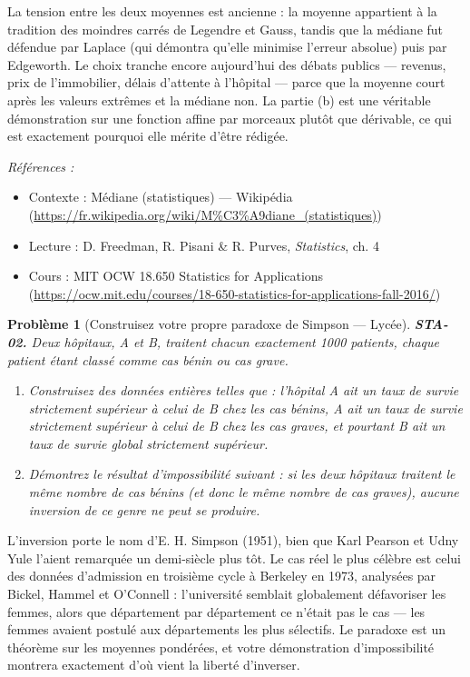 \documentclass[11pt]{article}
\newtheorem{problem}{Problème}
\newenvironment{refs}{\par\small\noindent\emph{Références :}\begin{itemize}\setlength\itemsep{0pt}}{\end{itemize}\normalsize}
\begin{document}
\noindent La tension entre les deux moyennes est ancienne : la moyenne appartient à la
tradition des moindres carrés de Legendre et Gauss, tandis que la médiane fut défendue par Laplace
(qui démontra qu'elle minimise l'erreur absolue) puis par Edgeworth. Le choix tranche encore
aujourd'hui des débats publics --- revenus, prix de l'immobilier, délais d'attente à l'hôpital ---
parce que la moyenne court après les valeurs extrêmes et la médiane non. La partie (b) est une
véritable démonstration sur une fonction affine par morceaux plutôt que dérivable, ce qui est
exactement pourquoi elle mérite d'être rédigée.

\begin{refs}
\item Contexte : Médiane (statistiques) --- Wikipédia (\url{https://fr.wikipedia.org/wiki/M%C3%A9diane_(statistiques)})
\item Lecture : D. Freedman, R. Pisani \& R. Purves, \textit{Statistics}, ch. 4
\item Cours : MIT OCW 18.650 Statistics for Applications (\url{https://ocw.mit.edu/courses/18-650-statistics-for-applications-fall-2016/})
\end{refs}

\bigskip

\begin{problem}[{Construisez votre propre paradoxe de Simpson --- Lycée}]
\textbf{STA-02.} Deux hôpitaux, A et B, traitent chacun exactement 1000 patients, chaque
patient étant classé comme cas bénin ou cas grave.
\begin{enumerate}
\item[(a)] Construisez des données entières telles que : l'hôpital A ait un taux de survie strictement
supérieur à celui de B chez les cas bénins, A ait un taux de survie strictement supérieur à celui
de B chez les cas graves, et pourtant B ait un taux de survie global strictement supérieur.
\item[(b)] Démontrez le résultat d'impossibilité suivant : si les deux hôpitaux traitent le \textit{même
nombre} de cas bénins (et donc le même nombre de cas graves), aucune inversion de ce genre ne
peut se produire.
\end{enumerate}

\end{problem}

\noindent L'inversion porte le nom d'E. H. Simpson (1951), bien que Karl Pearson et Udny
Yule l'aient remarquée un demi-siècle plus tôt. Le cas réel le plus célèbre est celui des données
d'admission en troisième cycle à Berkeley en 1973, analysées par Bickel, Hammel et O'Connell :
l'université semblait globalement défavoriser les femmes, alors que département par département ce
n'était pas le cas --- les femmes avaient postulé aux départements les plus sélectifs. Le paradoxe
est un théorème sur les moyennes pondérées, et votre démonstration d'impossibilité montrera
exactement d'où vient la liberté d'inverser.
\end{document}
